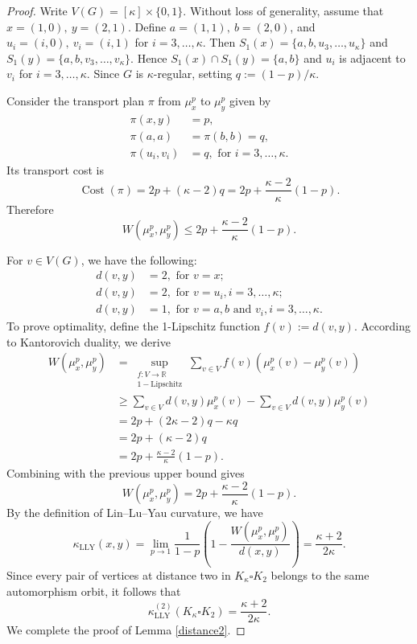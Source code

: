 \documentclass[10pt,a4paper]{article}
\theoremstyle{definition}
\theoremstyle{definition}
\theoremstyle{nonumber}
\begin{document}
\begin{proof}
Write $V(G)=[\kappa]\times\{0,1\}$. Without loss of generality, assume that $x=(1,0),\ y=(2,1)$. Define $a=(1,1),\ b=(2,0)$, and $u_i=(i,0),\ v_i=(i,1)$ for $i=3,\ldots,\kappa$. 
Then $S_1(x)=\{a,b,u_3,\ldots,u_\kappa\}$ and $S_1(y)=\{a,b,v_3,\ldots,v_\kappa\}$.
Hence $S_1(x)\cap S_1(y)=\{a,b\}$ and $u_i$ is adjacent to $v_i$ for $i=3,\ldots,\kappa$.
Since $G$ is $\kappa$-regular, setting $q:=(1-p)/\kappa$.

Consider the transport plan $\pi$ from $\mu_x^p$ to $\mu_y^p$ given by
\begin{align*} 
\pi(x,y)&=p,\\
\pi(a,a)&=\pi(b,b)=q,\\
\pi(u_i,v_i)&=q, \text{ for } i=3,\ldots,\kappa.
\end{align*}
Its transport cost is
$$
\operatorname{Cost}(\pi)=2p+(\kappa-2)q=2p+\frac{\kappa-2}{\kappa}(1-p).
$$
Therefore
$$
W(\mu_x^p,\mu_y^p)\leq2p+\frac{\kappa-2}{\kappa}(1-p).
$$

For $v\in V(G)$, we have the following:
\begin{align*} 
d(v, y) &= 2, \text{ for } v=x;\\
d(v, y) &= 2, \text{ for } v=u_i, i=3,\ldots,\kappa;\\
d(v, y) &= 1, \text{ for } v=a,b \text{ and }v_i,i=3,\ldots,\kappa.
\end{align*}
To prove optimality, define the 1-Lipschitz function $f(v):=d(v, y)$. According to Kantorovich duality, we derive
\begin{align*}
W(\mu_x^p, \mu_y^p) &= \sup_{\substack{f: V \to \mathbb{R} \\ 1-\text{Lipschitz}}} \sum_{v \in V} f(v) \left( \mu_x^p(v) - \mu_y^p(v) \right)\\
&\geq \sum_{v \in V} d(v, y) \mu_x^p(v) - \sum_{v \in V} d(v, y) \mu_y^p(v)\\
&= 2p+(2\kappa-2)q - \kappa q\\
&=2p+(\kappa-2)q\\
&=2p+\frac{\kappa-2}{\kappa}(1-p).
\end{align*}
Combining with the previous upper bound gives
$$
W(\mu_x^p,\mu_y^p)=2p+\frac{\kappa-2}{\kappa}(1-p).
$$
By the definition of Lin--Lu--Yau curvature, we have
$$
\kappa_{\mathrm{LLY}}(x,y)=\lim_{p\to1}\frac{1}{1-p} \left( 1 - \frac{W(\mu_x^p, \mu_y^p)}{d(x, y)} \right)=\frac{\kappa+2}{2\kappa}.
$$
Since every pair of vertices at distance two in $K_\kappa\square K_2$
belongs to the same automorphism orbit, it follows that
$$
\kappa_{\mathrm{LLY}}^{(2)}(K_\kappa\square K_2)=\frac{\kappa+2}{2\kappa}.
$$
We complete the proof of Lemma \ref{distance2}.
\end{proof}
\end{document}
